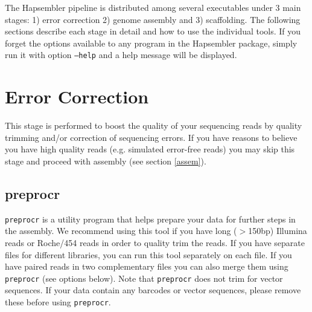 \documentclass[12pt,a4paper]{report}
\begin{document}
The Hapsembler pipeline is distributed among several executables under 3 main stages: 1) error correction 2) genome assembly and 3) scaffolding. The following sections describe each stage in detail and how to use the individual tools. If you forget the options available to any program in the Hapsembler package, simply run it with option \texttt{--help} and a help message will be displayed.

\section{Error Correction}
\label{ercor}

This stage is performed to boost the quality of your sequencing reads by quality trimming and/or correction of sequencing errors. If you have reasons to believe you have high quality reads (e.g. simulated error-free reads) you may skip this stage and proceed with assembly (see section \ref{assem}).

\subsection{preprocr}
\label{utils}

\texttt{preprocr} is a utility program that helps prepare your data for further steps in the assembly. We recommend using this tool if you have long ($>$150bp) Illumina reads or Roche/454 reads in order to quality trim the reads. If you have separate files for different libraries, you can run this tool separately on each file. If you have paired reads in two complementary files you can also merge them using \texttt{preprocr} (see options below). Note that \texttt{preprocr} does not trim for vector sequences. If your data contain any barcodes or vector sequences, please remove these before using \texttt{preprocr}.
\end{document}
